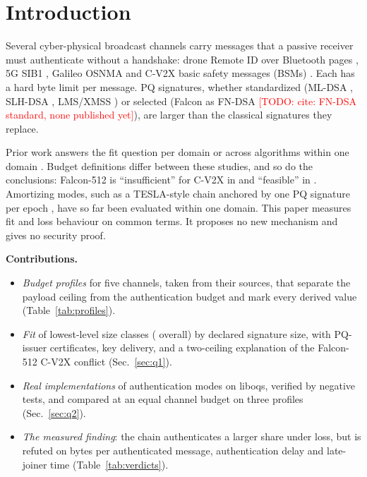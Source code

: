 \documentclass[conference]{IEEEtran}
\newcommand{\todo}[1]{\textcolor{red}{[TODO: #1]}}
\begin{document}
\section{Introduction}

Several cyber-physical broadcast channels carry messages that a passive
receiver must authenticate without a handshake: drone Remote ID over
Bluetooth pages \cite{wiethuechter2024drip}, 5G SIB1 \cite{darzi2026a},
Galileo OSNMA \cite{junquera2023assessment} and C-V2X basic safety
messages (BSMs) \cite{twardokus2024when,abrar2026deployment}. Each has a
hard byte limit per message. PQ signatures, whether standardized (ML-DSA
\cite{nist2024fips204}, SLH-DSA \cite{nist2024fips205}, LMS/XMSS
\cite{nist2020sp800208}) or selected (Falcon as FN-DSA \todo{cite: FN-DSA
standard, none published yet}), are larger than the classical signatures
they replace.

Prior work answers the fit question per domain
\cite{twardokus2024when,abrar2026deployment,junquera2023assessment,darzi2026a,goertzen2022post}
or across algorithms within one domain \cite{yoshizawa2026a,mamun2026post}.
Budget definitions differ between these studies, and so do the conclusions:
Falcon-512 is ``insufficient'' for C-V2X in \cite{twardokus2024when} and
``feasible'' in \cite{abrar2026deployment}. Amortizing modes, such as a
TESLA-style chain anchored by one PQ signature per epoch \cite{darzi2026a},
have so far been evaluated within one domain. This paper
measures fit and loss behaviour on common terms. It proposes no new
mechanism and gives no security proof.

\textbf{Contributions.}
\begin{itemize}
\item \emph{Budget profiles} for five channels, taken from their sources,
  that separate the payload ceiling from the authentication budget and mark
  every derived value (Table~\ref{tab:profiles}).
\item \emph{Fit} of \NumClassesLow{} lowest-level size classes
  (\NumClasses{} overall) by declared signature size, with PQ-issuer
  certificates, key delivery, and a two-ceiling explanation of the
  Falcon-512 C-V2X conflict (Sec.~\ref{sec:q1}).
\item \emph{Real implementations} of \NumModes{} authentication modes on
  liboqs, verified by \NegRuns{} negative tests, and compared at an equal
  channel budget on three profiles (Sec.~\ref{sec:q2}).
\item \emph{The measured finding}: the chain authenticates a larger share
  under loss, but is refuted on bytes per authenticated message,
  authentication delay and late-joiner time (Table~\ref{tab:verdicts}).
\end{itemize}
\end{document}
